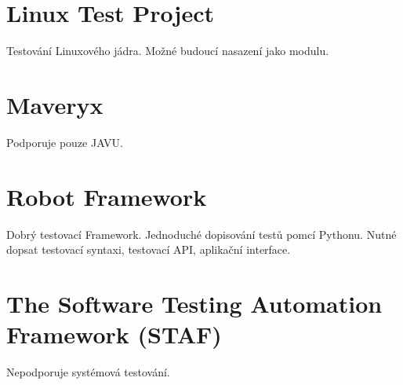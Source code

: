 \section{Linux Test Project}
Testování Linuxového jádra.
Možné budoucí nasazení jako modulu.


\section{Maveryx}
Podporuje pouze JAVU.


\section{Robot Framework}
Dobrý testovací Framework.
Jednoduché dopisování testů pomcí Pythonu.
Nutné dopsat testovací syntaxi, testovací API, aplikační interface.


\section{The Software Testing Automation Framework (STAF)}
Nepodporuje systémová testování.






\endinput
